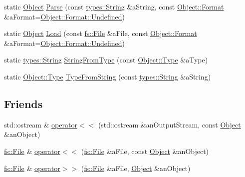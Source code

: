 \begin{DoxyCompactItemize}
\item 
static \hyperlink{classlibrary_1_1core_1_1ctnr_1_1_object}{Object} \hyperlink{classlibrary_1_1core_1_1ctnr_1_1_object_a6b668c679c62e64f1b3f671e124d9687}{Parse} (const \hyperlink{classlibrary_1_1core_1_1types_1_1_string}{types\+::\+String} \&a\+String, const \hyperlink{classlibrary_1_1core_1_1ctnr_1_1_object_a7bf8961c4ef65f691aa2993ec405c647}{Object\+::\+Format} \&a\+Format=\hyperlink{classlibrary_1_1core_1_1ctnr_1_1_object_a7bf8961c4ef65f691aa2993ec405c647aec0fc0100c4fc1ce4eea230c3dc10360}{Object\+::\+Format\+::\+Undefined})
\item 
static \hyperlink{classlibrary_1_1core_1_1ctnr_1_1_object}{Object} \hyperlink{classlibrary_1_1core_1_1ctnr_1_1_object_adab45c2029a462f75d8a397571f92e63}{Load} (const \hyperlink{classlibrary_1_1core_1_1fs_1_1_file}{fs\+::\+File} \&a\+File, const \hyperlink{classlibrary_1_1core_1_1ctnr_1_1_object_a7bf8961c4ef65f691aa2993ec405c647}{Object\+::\+Format} \&a\+Format=\hyperlink{classlibrary_1_1core_1_1ctnr_1_1_object_a7bf8961c4ef65f691aa2993ec405c647aec0fc0100c4fc1ce4eea230c3dc10360}{Object\+::\+Format\+::\+Undefined})
\item 
static \hyperlink{classlibrary_1_1core_1_1types_1_1_string}{types\+::\+String} \hyperlink{classlibrary_1_1core_1_1ctnr_1_1_object_ab070a3b341e562c587373644147c3006}{String\+From\+Type} (const \hyperlink{classlibrary_1_1core_1_1ctnr_1_1_object_a0766006ad111133d70349019551b31d6}{Object\+::\+Type} \&a\+Type)
\item 
static \hyperlink{classlibrary_1_1core_1_1ctnr_1_1_object_a0766006ad111133d70349019551b31d6}{Object\+::\+Type} \hyperlink{classlibrary_1_1core_1_1ctnr_1_1_object_a24126bc23a9ab818f3e64fc330c52fcc}{Type\+From\+String} (const \hyperlink{classlibrary_1_1core_1_1types_1_1_string}{types\+::\+String} \&a\+String)
\end{DoxyCompactItemize}
\subsection*{Friends}
\begin{DoxyCompactItemize}
\item 
std\+::ostream \& \hyperlink{classlibrary_1_1core_1_1ctnr_1_1_object_a418df9bf4a73078f3d494edef1743f8d}{operator$<$$<$} (std\+::ostream \&an\+Output\+Stream, const \hyperlink{classlibrary_1_1core_1_1ctnr_1_1_object}{Object} \&an\+Object)
\item 
\hyperlink{classlibrary_1_1core_1_1fs_1_1_file}{fs\+::\+File} \& \hyperlink{classlibrary_1_1core_1_1ctnr_1_1_object_af9350d4362cb9ad3424f4a6bb6d77a4c}{operator$<$$<$} (\hyperlink{classlibrary_1_1core_1_1fs_1_1_file}{fs\+::\+File} \&a\+File, const \hyperlink{classlibrary_1_1core_1_1ctnr_1_1_object}{Object} \&an\+Object)
\item 
\hyperlink{classlibrary_1_1core_1_1fs_1_1_file}{fs\+::\+File} \& \hyperlink{classlibrary_1_1core_1_1ctnr_1_1_object_ad91e1957f0afd5d49dde0b81d11a66e1}{operator$>$$>$} (\hyperlink{classlibrary_1_1core_1_1fs_1_1_file}{fs\+::\+File} \&a\+File, \hyperlink{classlibrary_1_1core_1_1ctnr_1_1_object}{Object} \&an\+Object)
\end{DoxyCompactItemize}


